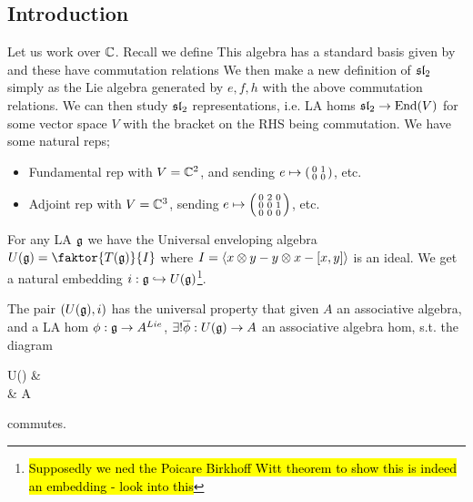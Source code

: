 \documentclass{article}
\begin{document}
\subsection{Introduction}
Let us work over $\mbb{C}$. Recall we define 
This algebra has a standard basis given by 
and these have commutation relations 
We then make a new definition of $\mf{sl}_2$ simply as the Lie algebra generated by $e,f,h$ with the above commutation relations. We can then study $\mf{sl}_2$ representations, i.e. LA homs $\mf{sl}_2 \to \End(V)$ for some vector space $V$ with the bracket on the RHS being commutation. We have some natural reps;
\begin{itemize}
    \item Fundamental rep with $V = \mbb{C}^2$, and sending $e \mapsto \begin{psmallmatrix} 0 & 1 \\ 0 & 0 \end{psmallmatrix} $, etc. 
    \item Adjoint rep with $V = \mbb{C}^3$, sending $e \mapsto \begin{psmallmatrix} 0 & 2 & 0 \\ 0 & 0 & 1 \\ 0 & 0 & 0 \end{psmallmatrix}$, etc. 
\end{itemize}

For any LA $\mf{g}$ we have the Universal enveloping algebra $U(\mf{g}) = \faktor{T(\mf{g})}{I}$ where $I = \pangle{x \otimes y - y \otimes x - \comm[x]{y}}$ is an ideal. We get a natural embedding $i:\mf{g} \hookrightarrow U(\mf{g})$\footnote{\hl{Supposedly we ned the Poicare Birkhoff Witt theorem to show this is indeed an embedding - look into this}}. 
\begin{prop}
The pair $(U(\mf{g}),i)$ has the universal property that given $A$ an associative algebra, and a LA hom $\phi:\mf{g} \to A^{Lie}$, $\exists ! \bar{\phi} : U(\mf{g}) \to A$ an associative algebra hom, s.t. the diagram 
\begin{tkz}
U()  & \\
 \arrow[u,"i",hook] \arrow[r,"\phi"'] & A 
\end{tkz}
commutes. 
\end{prop}
\end{document}
